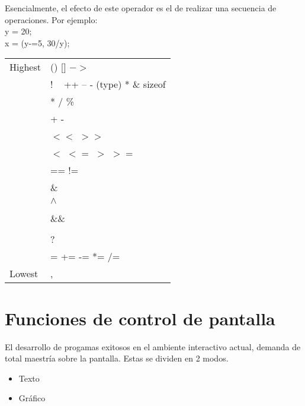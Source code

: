 \documentclass[]{article}
\begin{document}
			Esencialmente, el efecto de este operador es el de realizar una secuencia de operaciones. Por ejemplo:\\
			
			y = 20;\\
			
			x = (y-=5, 30/y);
			
			\begin{center}
				\begin{tabular}{l l}
					Highest & \hspace{50px} () [] $->$\\
					& \hspace{50px} ! ~ ++ -- - (type) * \& sizeof\\
					& \hspace{50px} * / \%\\
					& \hspace{50px} + -\\
					& \hspace{50px} $<<$ $>>$\\
					& \hspace{50px} $<$ $<=$ $>$ $>=$\\
					& \hspace{50px} == !=\\
					& \hspace{50px} \&\\
					& \hspace{50px} $\wedge$\\
					& \hspace{50px} \textbrokenbar\\
					& \hspace{50px} \&\&\\
					& \hspace{50px} \textbrokenbar\textbrokenbar\\
					& \hspace{50px} ?\\
					& \hspace{50px} = += -= *= /= \\
					Lowest & \hspace{50px} ,
				\end{tabular}
			\end{center}
		
		
	\section{Funciones de control de pantalla}
	
	El desarrollo de progamas exitosos en el ambiente interactivo actual, demanda de total maestría sobre la pantalla. Estas se dividen en 2 modos.
	\begin{itemize}
		\item Texto
		\item Gráfico
	\end{itemize}
	
\end{document}
